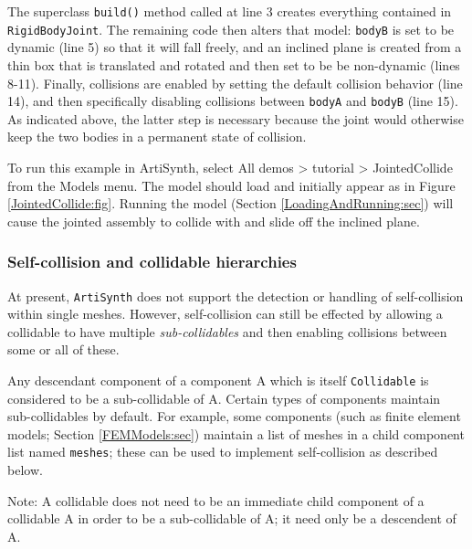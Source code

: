 The superclass {\tt build()} method called at line 3 creates
everything contained in {\tt RigidBodyJoint}. The remaining code then
alters that model: {\tt bodyB} is set to be dynamic (line 5) so that
it will fall freely, and an inclined plane is created from a thin box
that is translated and rotated and then set to be be non-dynamic
(lines 8-11).  Finally, collisions are enabled by setting the default
collision behavior (line 14), and then specifically disabling
collisions between {\tt bodyA} and {\tt bodyB} (line 15). As indicated
above, the latter step is necessary because the joint would otherwise
keep the two bodies in a permanent state of collision.

To run this example in ArtiSynth, select {\sf All demos > tutorial >
JointedCollide} from the {\sf Models} menu. The model should load and
initially appear as in Figure \ref{JointedCollide:fig}.  Running
the model (Section \ref{LoadingAndRunning:sec}) will
cause the jointed assembly to collide with and slide off the inclined
plane.


\subsubsection{Self-collision and collidable hierarchies}
\label{SelfCollision:sec}

At present, {\tt ArtiSynth} does not support the detection or handling
of self-collision within single meshes. However, self-collision can
still be effected by allowing a collidable to have multiple
{\it sub-collidables} and then enabling collisions between some or all of
these.

Any descendant component of a
 component A which is
itself {\tt Collidable} is considered to be a sub-collidable of A.
Certain types of components maintain sub-collidables by default.  For
example, some components (such as finite element models; Section
\ref{FEMModels:sec}) maintain a list of meshes in a child component
list named {\tt meshes}; these can be used to implement self-collision
as described below.

\begin{sideblock}
Note: A collidable does not need to be an immediate child component
of a collidable A in order to be a sub-collidable of A;
it need only be a descendent of A. 
\end{sideblock}


